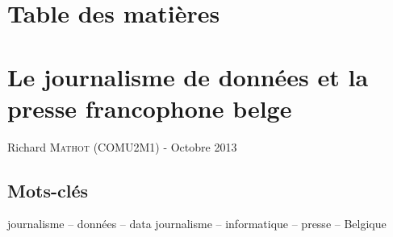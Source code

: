 \documentclass[12pt,a4paper,french,twoside,openright,oldfontcommands,final]{memoir}
\theoremstyle{plain}
\theoremstyle{definition}
\begin{document}
\frontmatter





\clearpage



\chapter*{ Table des matières}

\makeatletter
{}
\makeatother


\mainmatter
\renewcommand{\chaptermark}[1]{\markboth{\textsc{#1}}{\textsc{#1}}} 



\renewcommand{\chaptermark}[1]{\markboth{\textsc{\chaptername~\thechapter{} -- #1}}{}} 
\renewcommand{\sectionmark}[1]{\markright{\textsc{\thesection{} #1}}}







\renewcommand{\chaptermark}[1]{\markboth{\textsc{#1}}{\textsc{#1}}} 

 


\backmatter{}
\setcounter{page}{1}

\nocite{*}
\small


\normalsize


\cleardoublepage{}
\strut 
\newpage


\chapter*{Le journalisme de données et la presse francophone belge}

Richard \textsc{Mathot} (COMU2M1) - Octobre 2013

\section*{Mots-clés}
journalisme -- données -- data journalisme -- informatique -- presse -- Belgique
\end{document}
